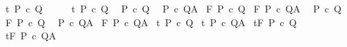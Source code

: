 \begin{isabellebody}
\ {\isachardoublequoteopen}{\isasymGamma}{\isasymturnstile}\isactrlsub t\ P\ c\ Q{\isachardoublequoteclose}\ \ \ \ {\isacharless}{\isacharequal}\ \ {\isachardoublequoteopen}{\isasymGamma}{\isasymturnstile}\isactrlsub t\ P\ c\ Q{\isacharcomma}{\isacharbraceleft}{\isacharbraceright}{\isachardoublequoteclose}\isanewline
\isanewline
\isanewline
{}\isamarkupfalse%
\ {\isachardoublequoteopen}{\isasymGamma}{\isasymturnstile}\ P\ c\ Q{\isachardoublequoteclose}\isanewline
{}\isamarkupfalse%
\ {\isachardoublequoteopen}{\isasymGamma}{\isasymturnstile}\ P\ c\ Q{\isacharcomma}A{\isachardoublequoteclose}\isanewline
\isanewline
{}\isamarkupfalse%
\ {\isachardoublequoteopen}{\isasymGamma}{\isasymturnstile}\isactrlbsub {\isacharslash}F\isactrlesub \ P\ c\ Q{\isachardoublequoteclose}\isanewline
{}\isamarkupfalse%
\ {\isachardoublequoteopen}{\isasymGamma}{\isasymturnstile}\isactrlbsub {\isacharslash}F\isactrlesub \ P\ c\ Q{\isacharcomma}A{\isachardoublequoteclose}\isanewline
\isanewline
{}\isamarkupfalse%
\ {\isachardoublequoteopen}{\isasymGamma}{\isacharcomma}{\isasymTheta}{\isasymturnstile}\ P\ c\ Q{\isachardoublequoteclose}\isanewline
{}\isamarkupfalse%
\ {\isachardoublequoteopen}{\isasymGamma}{\isacharcomma}{\isasymTheta}{\isasymturnstile}\isactrlbsub {\isacharslash}F\isactrlesub \ P\ c\ Q{\isachardoublequoteclose}\isanewline
\isanewline
{}\isamarkupfalse%
\ {\isachardoublequoteopen}{\isasymGamma}{\isacharcomma}{\isasymTheta}{\isasymturnstile}\ P\ c\ Q{\isacharcomma}A{\isachardoublequoteclose}\isanewline
{}\isamarkupfalse%
\ {\isachardoublequoteopen}{\isasymGamma}{\isacharcomma}{\isasymTheta}{\isasymturnstile}\isactrlbsub {\isacharslash}F\isactrlesub \ P\ c\ Q{\isacharcomma}A{\isachardoublequoteclose}\isanewline
\isanewline
\isanewline
{}\isamarkupfalse%
\ {\isachardoublequoteopen}{\isasymGamma}{\isasymturnstile}\isactrlsub t\ P\ c\ Q{\isachardoublequoteclose}\isanewline
{}\isamarkupfalse%
\ {\isachardoublequoteopen}{\isasymGamma}{\isasymturnstile}\isactrlsub t\ P\ c\ Q{\isacharcomma}A{\isachardoublequoteclose}\isanewline
\isanewline
{}\isamarkupfalse%
\ {\isachardoublequoteopen}{\isasymGamma}{\isasymturnstile}\isactrlsub t\isactrlbsub {\isacharslash}F\isactrlesub \ P\ c\ Q{\isachardoublequoteclose}\isanewline
{}\isamarkupfalse%
\ {\isachardoublequoteopen}{\isasymGamma}{\isasymturnstile}\isactrlsub t\isactrlbsub {\isacharslash}F\isactrlesub \ P\ c\ Q{\isacharcomma}A{\isachardoublequoteclose}\isanewline

\end{isabellebody}
